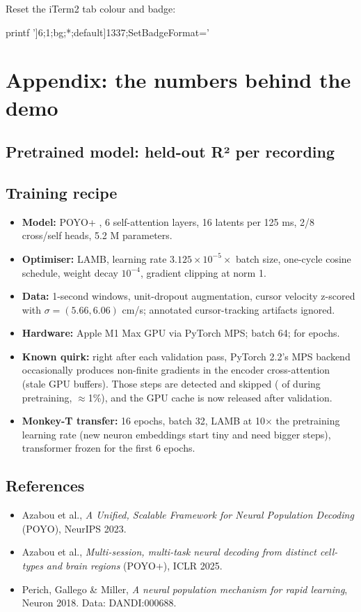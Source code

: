 \documentclass[11pt]{article}
\newcommand{\code}[1]{\texttt{\detokenize{#1}}}
\begin{document}
Reset the iTerm2 tab colour and badge:
\begin{term}
printf '\e]6;1;bg;*;default\a\e]1337;SetBadgeFormat=\a'
\end{term}

\clearpage
\section{Appendix: the numbers behind the demo}

\subsection*{Pretrained model: held-out R² per recording}


\subsection*{Training recipe}
\begin{itemize}
\item \textbf{Model:} POYO+ \code{dim=128}, 6 self-attention layers, 16 latents per 125 ms, 2/8 cross/self heads, 5.2 M parameters.
\item \textbf{Optimiser:} LAMB, learning rate $3.125\times10^{-5}\times$ batch size, one-cycle cosine schedule,
  weight decay $10^{-4}$, gradient clipping at norm 1.
\item \textbf{Data:} 1-second windows, unit-dropout augmentation, cursor velocity z-scored with
  $\sigma = (5.66, 6.06)$ cm/s; annotated cursor-tracking artifacts ignored.
\item \textbf{Hardware:} Apple M1 Max GPU via PyTorch MPS; batch 64; \PretrainHours{} for \PretrainEpochs{} epochs.
\item \textbf{Known quirk:} right after each validation pass, PyTorch 2.2's MPS backend occasionally produces non-finite
  gradients in the encoder cross-attention (stale GPU buffers). Those steps are detected and skipped
  (\PretrainSkipped{} of \PretrainSteps{} during pretraining, $\approx$1\%), and the GPU cache is now released after
  validation.
\item \textbf{Monkey-T transfer:} 16 epochs, batch 32, LAMB at 10$\times$ the pretraining learning rate (new neuron
  embeddings start tiny and need bigger steps), transformer frozen for the first 6 epochs.
\end{itemize}

\subsection*{References}
\begin{itemize}
\item Azabou et al., \emph{A Unified, Scalable Framework for Neural Population Decoding} (POYO), NeurIPS 2023.
\item Azabou et al., \emph{Multi-session, multi-task neural decoding from distinct cell-types and brain regions} (POYO+), ICLR 2025.
\item Perich, Gallego \& Miller, \emph{A neural population mechanism for rapid learning}, Neuron 2018. Data: DANDI:000688.
\end{itemize}
\end{document}
